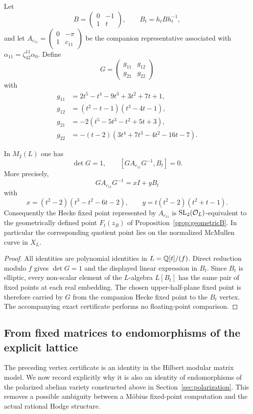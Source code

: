 Let
\[
 B=\begin{pmatrix}0&-1\\1&t\end{pmatrix},\qquad B_t=h_tBh_t^{-1},
\]
and let $A_{c_{11}}=\left(\begin{smallmatrix}0&-\pi\\1&c_{11}\end{smallmatrix}\right)$ be the companion representative associated with $\alpha_{11}=\zeta_{42}^{11}\alpha_0$.  Define
\[
 G=\begin{pmatrix}g_{11}&g_{12}\\g_{21}&g_{22}\end{pmatrix}
\]
with
\begin{align*}
 g_{11}&=2t^5-t^4-9t^3+3t^2+7t+1,\\
 g_{12}&=(t^2-t-1)(t^3-4t-1),\\
 g_{21}&=-2(t^5-5t^3-t^2+5t+3),\\
 g_{22}&=-(t-2)(3t^4+7t^3-4t^2-16t-7).
\end{align*}

\begin{theorem}\label{thm:Bvertex}
In $M_2(L)$ one has
\[
 \det G=1,
 \qquad
 [GA_{c_{11}}G^{-1},B_t]=0.
\]
More precisely,
\[
 GA_{c_{11}}G^{-1}=xI+yB_t
\]
with
\[
 x=(t^2-2)(t^3-t^2-6t-2),\qquad
 y=t(t^2-2)(t^2+t-1).
\]
Consequently the Hecke fixed point represented by $A_{c_{11}}$ is
$\mathrm{SL}_2(\mathcal O_L)$-equivalent to the geometrically defined point $F_t(z_B)$ of Proposition~\ref{prop:geometricB}.  In particular the corresponding quotient point lies on the normalized McMullen curve in $X_L$.
\end{theorem}
\begin{proof}
All identities are polynomial identities in $L=\mathbb Q[t]/(f)$.  Direct reduction modulo $f$ gives $\det G=1$ and the displayed linear expression in $B_t$.  Since $B_t$ is elliptic, every non-scalar element of the $L$-algebra $L[B_t]$ has the same pair of fixed points at each real embedding.  The chosen upper-half-plane fixed point is therefore carried by $G$ from the companion Hecke fixed point to the $B_t$ vertex.  The accompanying exact certificate performs no floating-point comparison.
\end{proof}


\subsection{From fixed matrices to endomorphisms of the explicit lattice}\label{sec:latticetransport}
The preceding vertex certificate is an identity in the Hilbert modular matrix model.  We now record explicitly why it is also an identity of endomorphisms of the polarized abelian variety constructed above in Section~\ref{sec:polarization}.  This removes a possible ambiguity between a Möbius fixed-point computation and the actual rational Hodge structure.

